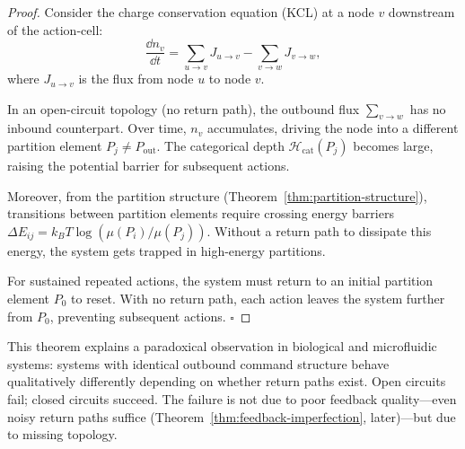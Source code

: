 \begin{proof}
Consider the charge conservation equation (KCL) at a node $v$ downstream of the action-cell:
\begin{equation}
  \frac{\dd n_v}{\dd t} = \sum_{u \to v} J_{u \to v} - \sum_{v \to w} J_{v \to w},
\end{equation}
where $J_{u \to v}$ is the flux from node $u$ to node $v$.

In an open-circuit topology (no return path), the outbound flux $\sum_{v \to w}$ has no inbound counterpart. Over time, $n_v$ accumulates, driving the node into a different partition element $P_j \ne P_{\text{out}}$. The categorical depth $\mathcal{H}_{\text{cat}}(P_j)$ becomes large, raising the potential barrier for subsequent actions.

Moreover, from the partition structure (Theorem~\ref{thm:partition-structure}), transitions between partition elements require crossing energy barriers $\Delta E_{ij} = k_B T \log(\mu(P_i)/\mu(P_j))$. Without a return path to dissipate this energy, the system gets trapped in high-energy partitions.

For sustained repeated actions, the system must return to an initial partition element $P_0$ to reset. With no return path, each action leaves the system further from $P_0$, preventing subsequent actions. $\square$
\end{proof}

\begin{remark}
This theorem explains a paradoxical observation in biological and microfluidic systems: systems with identical outbound command structure behave qualitatively differently depending on whether return paths exist. Open circuits fail; closed circuits succeed. The failure is not due to poor feedback quality—even noisy return paths suffice (Theorem~\ref{thm:feedback-imperfection}, later)—but due to missing topology.
\end{remark}

